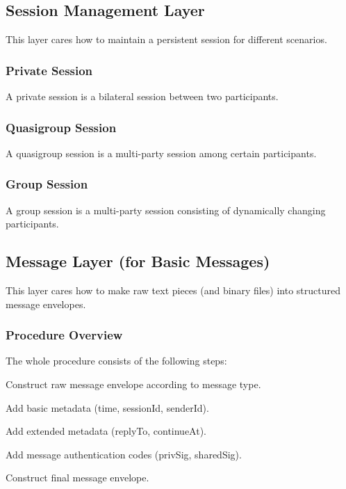 \subsection{Session Management Layer}

This layer cares how to maintain a persistent session for different scenarios.

\subsubsection{Private Session}

A private session is a bilateral session between two participants.

\subsubsection{Quasigroup Session}

A quasigroup session is a multi-party session among certain participants.

\subsubsection{Group Session}

A group session is a multi-party session consisting of dynamically changing participants.

\subsection{Message Layer (for Basic Messages)}

This layer cares how to make raw text pieces (and binary files) into structured message envelopes.

\subsubsection{Procedure Overview}

The whole procedure consists of the following steps:

\begin{compactitem}
    \item Construct raw message envelope according to message type.
    \item Add basic metadata (time, sessionId, senderId).
    \item Add extended metadata (replyTo, continueAt).
    \item Add message authentication codes (privSig, sharedSig).
    \item Construct final message envelope.
\end{compactitem}

